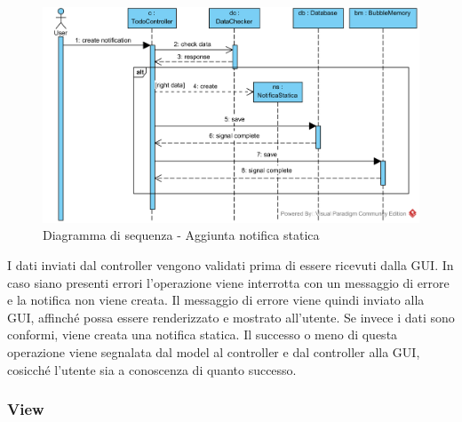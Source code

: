\begin{figure}[H]
	\centering
	\includegraphics[width=14cm]{../../documenti/SpecificaTecnica/diagrammi_img/sequenza/todo_aggiungi_notifica.png}
	\caption{Diagramma di sequenza - Aggiunta notifica statica}
\end{figure}
I dati inviati dal controller vengono validati prima di essere ricevuti dalla GUI. In caso siano presenti errori l'operazione viene interrotta con un messaggio di errore e la notifica non viene creata. Il messaggio di errore viene quindi inviato alla GUI, affinché possa essere renderizzato e mostrato all'utente. Se invece i dati sono conformi, viene creata una notifica statica. Il successo o meno di questa operazione viene segnalata dal model al controller e dal controller alla GUI, cosicché l'utente sia a conoscenza di quanto successo.

\subsubsection{View}

